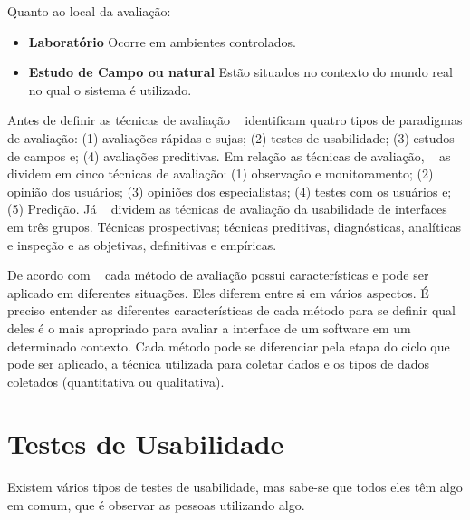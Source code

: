 	Quanto ao local da avaliação:

	\begin{itemize}
		\item \textbf{Laboratório} Ocorre em ambientes controlados.
		\item \textbf{Estudo de Campo ou natural} Estão situados no contexto do mundo real no qual o sistema é utilizado.
	\end{itemize}

	 
Antes de definir as técnicas de avaliação ~ identificam quatro tipos de paradigmas de avaliação: (1) avaliações rápidas e sujas; (2) testes de usabilidade; (3) estudos de campos e; (4) avaliações preditivas.
%
Em relação as técnicas de avaliação, ~ as dividem em cinco técnicas de avaliação: (1) observação e monitoramento; (2) opinião dos usuários; (3) opiniões dos especialistas; (4) testes com os usuários e; (5) Predição. 
%
Já ~ dividem as técnicas de avaliação da usabilidade de interfaces em três grupos. Técnicas prospectivas; técnicas preditivas, diagnósticas, analíticas e inspeção e as objetivas, definitivas e empíricas.


De acordo com ~ cada método de avaliação possui características e pode ser aplicado em diferentes situações.
%
Eles diferem entre si em vários aspectos. É preciso entender as diferentes características de cada método para se definir qual deles é o mais apropriado para avaliar a interface de um software em um determinado contexto.
%
Cada método pode se diferenciar pela etapa do ciclo que pode ser aplicado, a técnica utilizada para coletar dados e os tipos de dados coletados (quantitativa ou qualitativa). 


\section{Testes de Usabilidade}

	Existem vários tipos de testes de usabilidade, mas sabe-se que todos eles têm algo em comum, que é observar as pessoas utilizando algo.


